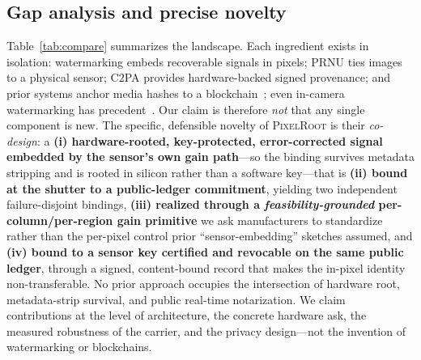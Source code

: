 \documentclass[journal]{IEEEtran}
\newcommand{\pr}{\textup{\textsc{PixelRoot}}}
\begin{document}
\subsection{Gap analysis and precise novelty}
Table~\ref{tab:compare} summarizes the landscape. Each ingredient exists in
isolation: watermarking embeds recoverable signals in pixels; PRNU ties images
to a physical sensor; C2PA provides hardware-backed signed provenance; and prior
systems anchor media hashes to a blockchain~\cite{hasan2019combating}; even
in-camera watermarking has precedent~\cite{blythe2004secure}. Our claim
is therefore \emph{not} that any single component is new. The specific,
defensible novelty of \pr{} is their \emph{co-design}: a \textbf{(i)
hardware-rooted, key-protected, error-corrected signal embedded by the sensor's
own gain path}---so the binding survives metadata stripping and is rooted in
silicon rather than a software key---that is \textbf{(ii) bound at the shutter to
a public-ledger commitment}, yielding two independent failure-disjoint bindings,
\textbf{(iii) realized through a \emph{feasibility-grounded} per-column/per-region
gain primitive} we ask manufacturers to standardize rather than the per-pixel
control prior ``sensor-embedding'' sketches assumed, and \textbf{(iv) bound to a
sensor key certified and revocable on the same public ledger}, through a signed,
content-bound record that makes the in-pixel identity non-transferable. No prior
approach occupies
the intersection of hardware root, metadata-strip survival, and public real-time
notarization. We claim contributions at the level of architecture, the concrete
hardware ask, the measured robustness of the carrier, and the privacy design---not
the invention of watermarking or blockchains.
\end{document}
